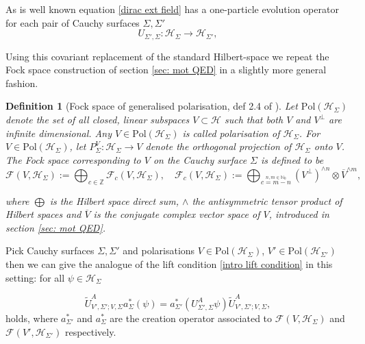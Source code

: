 \documentclass[b5paper,draft,openbib,12pt]{memoir}
\newtheorem{Def}{Definition}
\begin{document}
As is well known equation \eqref{dirac ext field} has a 
one-particle evolution operator for each pair of Cauchy surfaces \(\Sigma, \Sigma'\)
\begin{equation}
U_{\Sigma',\Sigma}:\mathcal{H}_\Sigma \rightarrow \mathcal{H}_{\Sigma'},
\end{equation}

Using this covariant replacement of the standard Hilbert-space we 
repeat the Fock space construction of section \ref{sec: mot QED} 
in a slightly more general fashion.

\begin{Def}[Fock space of generalised polarisation, def 2.4 of \cite{deckert2016perspective}]
  Let \(\text{Pol} (\mathcal{H}_\Sigma)\) denote the set of all 
  closed, linear subspaces \(V\subset \mathcal{H}\)
  such that both \(V\) and \(V^\perp\) are infinite dimensional. 
  Any \(V\in \text{Pol}(\mathcal{H}_\Sigma)\) is called 
  \emph{polarisation} of \(\mathcal{H}_\Sigma\). For 
  \(V\in \text{Pol}(\mathcal{H}_\Sigma)\), let 
  \(P_\Sigma^V:\mathcal{H}_{\Sigma}\rightarrow V\) 
  denote the orthogonal projection of \(\mathcal{H}_\Sigma\) onto 
  \(V\).
  The Fock space corresponding to \(V\) on the Cauchy surface 
  \(\Sigma\) is defined to be
  \begin{equation}
  \mathcal{F}(V,\mathcal{H}_\Sigma) := \bigoplus_{c\in\mathbb{Z}} \mathcal{F}_c (V,\mathcal{H}_\Sigma), \quad 
  \mathcal{F}_c(V,\mathcal{H}_\Sigma):= \bigoplus_{\overset{n,m\in\mathbb{N}_0}{c=m-n}}(V^\perp)^{\wedge n} \otimes \overline{V}^{\wedge m},
  \end{equation}
  
  where \(\bigoplus\) is the Hilbert space direct sum, \(\wedge\) 
  the antisymmetric tensor product of Hilbert spaces and 
  \(\overline{V}\) is the conjugate complex vector space of 
  \(V\), introduced in section \ref{sec: mot QED}.
\end{Def}

Pick Cauchy surfaces \(\Sigma, \Sigma'\) and polarisations 
\(V\in \text{Pol}(\mathcal{H}_\Sigma) \),
\(V'\in \text{Pol}(\mathcal{H}_{\Sigma'}) \)
then we can 
give the analogue of the lift condition  
\eqref{intro lift condition} in 
this setting: for all \(\psi \in \mathcal{H}_{\Sigma}\)

\begin{equation}\label{lift condition}
  \tilde{U}^A_{V',\Sigma'; V,\Sigma} a_\Sigma^*(\psi)
  =a^*_{\Sigma'}(U^A_{\Sigma',\Sigma}\psi )\tilde{U}^A_{V',\Sigma';V,\Sigma},\tag{lift condition}
\end{equation}
holds, where \(a^*_{\Sigma'}\) and \(a^*_{\Sigma}\) are the 
creation operator associated to 
\(\mathcal{F}(V,\mathcal{H}_{\Sigma})\) and 
\(\mathcal{F}(V',\mathcal{H}_{\Sigma'})\) respectively. 
\end{document}

